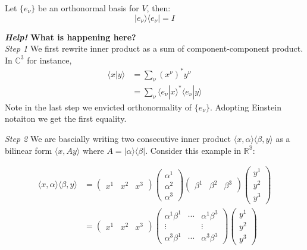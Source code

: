 \begin{lemma}Let $\{e_{\nu}\}$ be an orthonormal basis for $V$, then:
\begin{equation}
|e_{\nu} \rangle \langle e_{\nu}|=I
\end{equation}

\end{lemma}\begin{framed}
\textbf{\textit{Help!} What is happening here?}\\
\textit{Step 1} We first rewrite inner product as a sum of component-component product. In $\mathbb{C}^3$ for instance,
\begin{equation}
\begin{aligned}
\langle x | y\rangle &= \sum_{\nu} (x^{\nu})^* y^{\nu} \\
&= \sum_{\nu} \langle e_{\nu} | x \rangle^*  \langle e_{\nu} | y \rangle
\end{aligned}
\end{equation}
Note in the last step we envicted orthonormality of $\{e_\nu\}$. Adopting Einstein notaiton we get the first equality.

\textit{Step 2} We are bascially writing two consecutive inner product $\langle x, \alpha \rangle \langle \beta, y \rangle$ as a bilinear form $\langle x, A y\rangle$ where $A=| \alpha \rangle \langle \beta |$. Consider this example in $\mathbb{R^3}$:

\begin{equation}
\begin{aligned}
\langle x, \alpha \rangle \langle \beta, y \rangle &=
\begin{pmatrix}
x^1 & x^2 & x^3
\end{pmatrix}
\begin{pmatrix}
\alpha^1 \\ \alpha^2 \\ \alpha^3
\end{pmatrix}
\begin{pmatrix}
\beta^1 & \beta^2 & \beta^3
\end{pmatrix}
\begin{pmatrix}
y^1 \\ y^2 \\ y^3
\end{pmatrix} \\
&= 
\begin{pmatrix}
x^1 & x^2 & x^3
\end{pmatrix}
\begin{pmatrix}
\alpha^1 \beta^1 & \cdots & \alpha^1\beta^3 \\
\vdots & & \vdots \\
\alpha^3 \beta^1 & \cdots & \alpha^3\beta^3
\end{pmatrix}
\begin{pmatrix}
y^1 \\ y^2 \\ y^3
\end{pmatrix} \\
\end{aligned}
\end{equation}


\end{framed}
